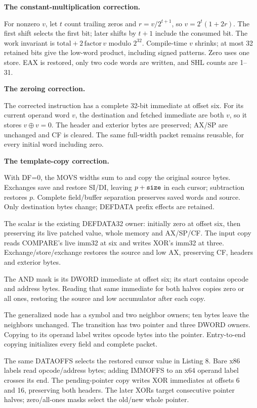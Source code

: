 \documentclass[10pt,a4paper]{article}
\newcommand{\code}[1]{\texttt{\detokenize{#1}}}
\newcommand{\itemtitle}[1]{\par\vspace{0pt}\textbf{#1}\par\nopagebreak}
\begin{document}
\itemtitle{The constant-multiplication correction.}
For nonzero $v$, let $t$ count trailing zeros and $r=v/2^{t+1}$, so
$v=2^t(1+2r)$. The first shift selects the first bit; later shifts by $t+1$
include the consumed bit. The work invariant is $\mathrm{total}+2\,\mathrm{factor}\,v$
modulo $2^{32}$. Compile-time $v$ shrinks; at most 32 retained bits give the
low-word product, including signed patterns. Zero uses one store. EAX is
restored, only two code words are written, and SHL counts are 1--31.

\itemtitle{The zeroing correction.}
The corrected instruction has a complete 32-bit immediate at offset six.
For its current operand word $v$, the destination and fetched immediate are
both $v$, so it stores $v\mathbin{\oplus}v=0$. The header and exterior bytes
are preserved; AX/SP are unchanged and CF is cleared. The same full-width
packet remains reusable, for every initial word including zero.

\itemtitle{The template-copy correction.}
With DF=0, the MOVS widths sum to \code{size} and copy the original source
bytes. Exchanges save and restore SI/DI, leaving $p+\code{size}$ in each
cursor; subtraction restores $p$. Complete field/buffer separation preserves
saved words and source. Only destination bytes change; DEFDATA prefix effects
are retained.

The scalar is the existing DEFDATA32 owner: initially zero at offset six,
then preserving its live patched value, whole memory and AX/SP/CF.
The input copy reads COMPARE's live imm32 at six and writes XOR's imm32 at three.
Exchange/store/exchange restores the source and low AX, preserving CF,
headers and exterior bytes.

The AND mask is its DWORD immediate at offset six; its start contains opcode
and address bytes. Reading that same immediate for both halves copies zero
or all ones, restoring the source and low accumulator after each copy.


The generalized node has a symbol and two neighbor owners; ten bytes leave
the neighbors unchanged. The transition has two pointer and three DWORD
owners. Copying to its operand label writes opcode bytes into the pointer.
Entry-to-end copying initializes every field and complete packet.

The same DATAOFFS selects the restored cursor value in Listing 8. Bare
x86 labels read opcode/address bytes; adding IMMOFFS to an x64 operand label
crosses its end. The pending-pointer copy writes XOR immediates at offsets
6 and 16, preserving both headers. The later XORs target consecutive pointer
halves; zero/all-ones masks select the old/new whole pointer.
\end{document}
